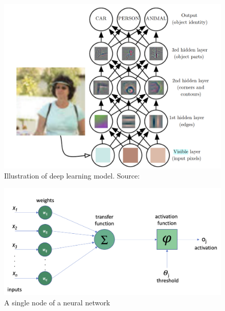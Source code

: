 \begin{figure}[t]
	\centering
	\includegraphics[width=\textwidth]{content/imgs/deep_learning_feature}
	\caption{Illustration of deep learning model. Source: \cite{Goodfellow-et-al-2016}}
	\label{fig:deep learning model}
\end{figure}



\begin{figure}[h]
	\centering
	\includegraphics[width=\textwidth]{content/imgs/neuron}
	\caption{A single node of a neural network}
	\label{fig: neuron}
\end{figure}

